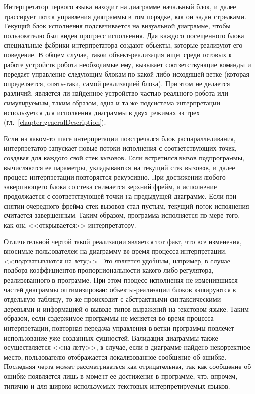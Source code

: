 \documentclass[conference]{IEEEtran}
\begin{document}
Интерпретатор первого языка находит на диаграмме начальный блок, и далее трассирует поток управления диаграммы в том порядке, как он задан стрелками. Текущий блок исполнения подсвечивается на визуальной диаграмме, чтобы пользователю был виден прогресс исполнения. Для каждого посещенного блока специальные фабрики интерпретатора создают объекты, которые реализуют его поведение. В общем случае, такой объект-реализация ищет среди готовых к работе устройств робота необходимые ему, вызывает соответствующие команды и передает управление следующим блокам по какой-либо исходящей ветке (которая определяется, опять-таки, самой реализацией блока). При этом не делается различий, является ли найденное устройство частью реального робота или симулируемым, таким образом, одна и та же подсистема интерпретации используется для исполнения диаграммы в двух режимах из трех (гл.~\ref{chapter:generalDescription}).

Если на каком-то шаге интерпретации повстречался блок распараллеливания, интерпретатор запускает новые потоки исполнения с соответствующих точек, создавая для каждого свой стек вызовов. Если встретился вызов подпрограммы, вычисляются ее параметры, укладываются на текущий стек вызовов, и далее процесс интерпретации повторяется рекурсивно. При достижении любого завершающего блока со стека снимается верхний фрейм, и исполнение продолжается с соответствующей точки на предыдущей диаграмме. Если при снятии очередного фрейма стек вызовов стал пустым, текущий поток исполнения считается завершенным. Таким образом, программа исполняется по мере того, как она <<открывается>> интерпретатору.

Отличительной чертой такой реализации является тот факт, что все изменения, вносимые пользователем на диаграмму во время процесса интерпретации, <<подхватываются на лету>>. Это является удобным, например, в случае подбора коэффициентов пропорциональности какого-либо регулятора, реализованного в программе. При этом процесс исполнения не изменившихся частей диаграммы оптимизирован: объекты-реализации блоков кэшируются в отдельную таблицу, то же происходит с абстрактными синтаксическими деревьями и информацией о выводе типов выражений на текстовом языке. Таким образом, если содержимое программы не меняется во время процесса интерпретации, повторная передача управления в ветки программы повлечет использование уже созданных сущностей. Валидация диаграммы также осуществляется <<на лету>>, в случае, если в диаграмме найдено некорректное место, пользователю отображается локализованное сообщение об ошибке. Последняя черта может рассматриваться как отрицательная, так как сообщение об ошибке появляется лишь в момент ее достижения в программе, что, впрочем, типично и для широко используемых текстовых интерпретируемых языков.
\end{document}
